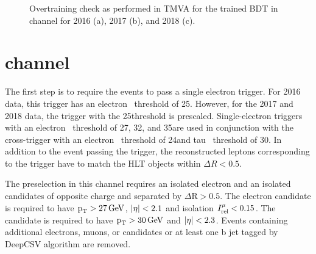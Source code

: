 \begin{figure}[htbp]
  \centering
  \caption{Overtraining check as performed in TMVA for the trained BDT in \Hmue channel for 2016 (a), 2017 (b), and 2018 (c).}
  \label{fig:mutaue_bdttrain}
\end{figure}

\section{\texorpdfstring{\Hehad}{Hetauh} channel}
The first step is to require the events to pass a single electron trigger. For 2016 data, this trigger has an electron \pt\, threshold of 25\GeV. However, for the 2017 and 2018 data, the trigger with the 25\GeV threshold is prescaled. Single-electron triggers with an electron \pt\, threshold of 27\GeV, 32\GeV, and 35\GeV are used in conjunction with the cross-trigger with an electron \pt\, threshold of 24\GeV and tau \pt\, threshold of 30\GeV. In addition to the event passing the trigger, the reconstructed leptons corresponding to the trigger have to match the HLT objects within $\Delta R < 0.5$.

The  preselection in this channel requires an isolated electron and an isolated \tauh candidates of opposite charge and separated by $\Delta\text{R} > 0.5$. The electron candidate is required to have $\text{p}_\text{T} > 27\,\text{Ge\hspace{-.08em}V}$, $\lvert\eta\rvert < 2.1$ and isolation $I^{\mu}_\text{rel} < 0.15$. The \tauh candidate is required to have $\text{p}_\text{T} > 30\,\text{Ge\hspace{-.08em}V}$ and $\lvert\eta\rvert < 2.3$. Events containing additional electrons, muons, or \tauh candidates or at least one b jet tagged by DeepCSV algorithm are removed.

